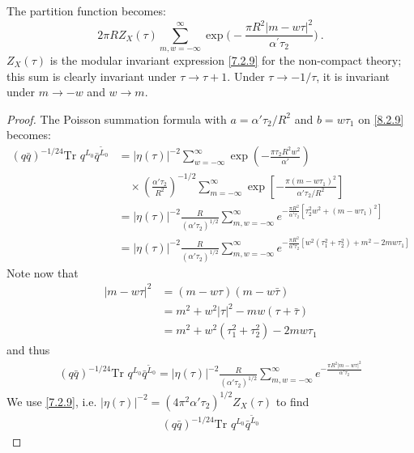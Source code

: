 The partition function becomes:
\begin{equation}
	2 \pi R Z_{X}(\tau) \sum_{m, w=-\infty}^{\infty} \exp \biggl(-\frac{\pi R^{2}|m-w \tau|^{2}}{\alpha^{\prime} \tau_{2}}\biggr) \:. \label{8.2.11}
\end{equation}
$Z_{X}(\tau)$ is the modular invariant expression \eqref{7.2.9} for the non-compact theory; this sum is clearly invariant under $\tau \rightarrow \tau+1$. Under $\tau \rightarrow-1 / \tau$, it is invariant under $m\to-w$ and $w\to m$.

\begin{tcolorbox}[breakable]
	\begin{proof}
	The Poisson summation formula with \( a = \alpha' \tau_2 / R^2 \) and \( b = w \tau_1 \) on \eqref{8.2.9} becomes:
	\begin{align*}
		(q\bar{q})^{-1/24} \text{Tr } q^{L_0} \bar{q}^{\tilde{L}_0} 
		&= |\eta(\tau)|^{-2} \sum_{w=-\infty}^{\infty} \exp\left(-\frac{\pi \tau_2 R^2 w^2}{\alpha'} \right) \\
		&\quad \times \left( \frac{\alpha' \tau_2}{R^2} \right)^{-1/2} \sum_{m=-\infty}^{\infty} \exp\left[-\frac{\pi(m - w \tau_1)^2}{\alpha' \tau_2 / R^2}\right] \\
		&= |\eta(\tau)|^{-2} \frac{R}{(\alpha' \tau_2)^{1/2}} \sum_{m,w=-\infty}^{\infty} e^{-\frac{\pi R^2}{\alpha' \tau_2} \left[\tau_2^2 w^2 + (m-w \tau_1)^2\right]} \\
		&= |\eta(\tau)|^{-2} \frac{R}{(\alpha' \tau_2)^{1/2}} \sum_{m,w=-\infty}^{\infty} e^{-\frac{\pi R^2}{\alpha' \tau_2} \left[w^2 (\tau_1^2 + \tau_2^2) + m^2 - 2mw \tau_1\right]} 
	\end{align*}	
	Note now that
	\begin{align*}
		|m - w \tau|^2 &= (m - w \tau)(m - w \bar{\tau}) \\
		&= m^2 + w^2 |\tau|^2 - m w (\tau + \bar{\tau}) \\
		&= m^2 + w^2 (\tau_1^2 + \tau_2^2) - 2m w \tau_1 
	\end{align*}	
	and thus
	\begin{align*}
		(q\bar{q})^{-1/24} \text{Tr } q^{L_0} \bar{q}^{\tilde{L}_0} 
		= |\eta(\tau)|^{-2} \frac{R}{(\alpha' \tau_2)^{1/2}} \sum_{m,w=-\infty}^{\infty} e^{-\frac{\pi R^2 |m-w \tau|^2}{\alpha' \tau_2}} 
	\end{align*}
	We use \eqref{7.2.9}, i.e. \(|\eta(\tau)|^{-2} = (4\pi^2 \alpha' \tau_2)^{1/2} Z_X(\tau)\) to find
	\begin{align*}
		(q\bar{q})^{-1/24} \text{Tr } q^{L_0} \bar{q}^{\tilde{L}_0} 

\end{align*}
\end{proof}
\end{tcolorbox}
